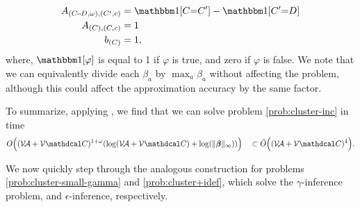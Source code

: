 \documentclass[twoside]{article}
\begin{document}
\begin{lproof}
\begin{align*}
        A_{(C\!{-}\!D, \omega),(C',c)} &= \mathbbm1[C{=}C'] - \mathbbm1[C'{=}D]\\
        A_{(C),(C,c)} &= 1 \\
        b_{(C)} &= 1,
    \end{align*}
    where, $\mathbbm1[\varphi]$ is equal to 1 if $\varphi$ is true, and zero if $\varphi$ is false.
    We note that we can equivalently divide each $\beta_a$ by $\max_a \beta_a$ without affecting the problem, 
    although this could affect the approximation accuracy by the same factor. 
    
    To summarize, applying , we find that we can solve problem \eqref{prob:cluster-inc} in time
    \begin{align*}
        O\Big( (\V\!\Ar + \V\mathdcal C)^{1 + \omega} ( \log (\V\!\Ar + \V\mathdcal C) + \log( \Vert\bbeta\Vert_\infty)) \Big)
        \quad
        \subset \tilde O\Big( (\V\!\Ar + \V\mathdcal C)^4 \Big).
    \end{align*}
\end{lproof}

We now quickly step through the analogous construction for problems \eqref{prob:cluster-small-gamma} and \eqref{prob:cluster+idef}, which
solve the $\gamma$-inference problem, and $\epsilon$-inference, respectively.
\end{document}
